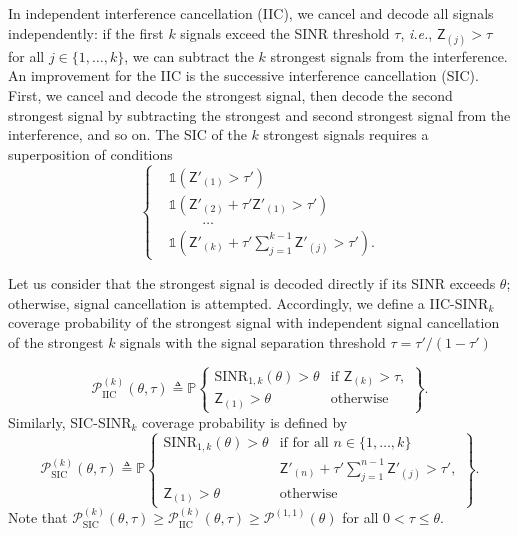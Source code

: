 \documentclass[lettersize,journal]{IEEEtran}
\begin{document}
In independent interference cancellation (IIC), we cancel and decode all signals independently: if the first $k$ signals exceed the SINR threshold $\tau$, \textit{i.e.}, $\mathsf{Z}_{(j)} > \tau$ for all $j \in \{1,\dots,k\}$, we can subtract the $k$ strongest signals from the interference. An improvement for the IIC is the successive interference cancellation (SIC). First, we cancel and decode the strongest signal, then decode the second strongest signal by subtracting the strongest and second strongest signal from the interference, and so on. The SIC of the $k$ strongest signals requires a superposition of conditions
\begin{equation}
  \label{eq:SIC-SINRcond}
  \begin{cases}
    &\mathds{1} \left(\mathsf{Z}'_{(1)} > \tau'\right)\\
    &\mathds{1}\left( \mathsf{Z}'_{(2)} + \tau' \mathsf{Z}'_{(1)}> \tau'\right) \\
    &\hspace{1cm}\dots \\
    &\mathds{1} \left(\mathsf{Z}'_{(k)} + \tau' \sum_{j=1}^{k-1}\mathsf{Z}'_{(j)}> \tau'\right).
  \end{cases}
\end{equation}


Let us consider that the strongest signal is decoded directly if its SINR exceeds $\theta$; otherwise, signal cancellation is attempted. Accordingly, we define a IIC-SINR$_{k}$ coverage probability of the strongest signal with independent signal cancellation of the strongest $k$ signals with the signal separation threshold $\tau=\tau'/(1-\tau')$ 

\begin{equation}
  \mathcal{P}^{(k)}_{\text{IIC}}(\theta,\tau) \triangleq \mathbb{P}\begin{Bmatrix} \text{SINR}_{1,k}(\theta)>\theta & \text{if } \mathsf{Z}_{(k)}>\tau, \\
\mathsf{Z}_{(1)}>\theta & \text{otherwise} \end{Bmatrix}.
\end{equation}
Similarly, SIC-SINR$_{k}$ coverage probability is defined by
\begin{equation}
  \label{eq:SIC-SINRprob}
  \mathcal{P}^{(k)}_{\text{SIC}}(\theta,\tau) \triangleq \mathbb{P}\begin{Bmatrix} \text{SINR}_{1,k}(\theta)>\theta & \text{if for all }n\in\{1,\dots,k\}  \\
    & \mathsf{Z}'_{(n)}+\tau'\sum\limits_{j=1}^{n-1}\mathsf{Z}'_{(j)}>\tau',\\
\mathsf{Z}_{(1)}>\theta & \text{otherwise} \end{Bmatrix}.
\end{equation}
Note that $\mathcal{P}^{(k)}_{\text{SIC}}(\theta,\tau)\geq \mathcal{P}^{(k)}_{\text{IIC}}(\theta,\tau) \geq \mathcal{P}^{(1,1)}(\theta)$ for all $0<\tau \leq \theta$. 
\end{document}
